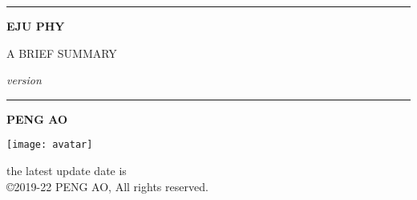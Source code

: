 
\begin{titlepage}
    \begin{center}
        \vspace{4cm}
        
        \rule{\textwidth}{1.2pt}
        
        \vspace{0.3cm}

        {\Huge \textbf{EJU PHY}}

        \vspace{0.3cm}

        {\LARGE A BRIEF SUMMARY}

        \vspace{0.3cm}

        {\Large \textit{version \version}}

        \rule{\textwidth}{1.2pt}

        \vspace{2cm}

        {\LARGE \textbf{PENG AO}}

        \vfill

        \texttt{[image: avatar]}

        {\Large the latest update date is \updatedate\\
        \copyright2019-22 PENG AO, All rights reserved.}
    \end{center}
\end{titlepage}


